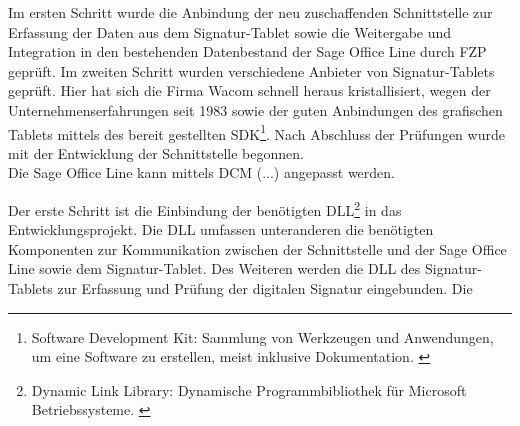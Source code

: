 Im ersten Schritt wurde die Anbindung der neu zuschaffenden Schnittstelle zur Erfassung der Daten aus dem Signatur-Tablet sowie die Weitergabe und Integration in den bestehenden Datenbestand der Sage Office Line durch FZP geprüft. Im zweiten Schritt wurden verschiedene Anbieter von Signatur-Tablets geprüft. Hier hat sich die Firma Wacom schnell heraus kristallisiert, wegen der Unternehmenserfahrungen seit 1983 \cite{konzept1} sowie der guten Anbindungen des grafischen Tablets mittels des bereit gestellten SDK\footnote{\label{foot:4} Software Development Kit: Sammlung von Werkzeugen und Anwendungen, um eine Software zu erstellen, meist inklusive Dokumentation. \cite{SDK}}. Nach Abschluss der Prüfungen wurde mit der Entwicklung der Schnittstelle begonnen.\\
Die Sage Office Line kann mittels DCM (...) angepasst werden.  

Der erste Schritt ist die Einbindung der benötigten DLL\footnote{\label{foot:5} Dynamic Link Library: Dynamische Programmbibliothek für Microsoft Betriebssysteme. \cite{DLL}} in das Entwicklungsprojekt. Die DLL umfassen unteranderen die benötigten Komponenten zur Kommunikation zwischen der Schnittstelle und der Sage Office Line sowie dem Signatur-Tablet. Des Weiteren werden die DLL des Signatur-Tablets zur Erfassung und Prüfung der digitalen Signatur eingebunden. Die 